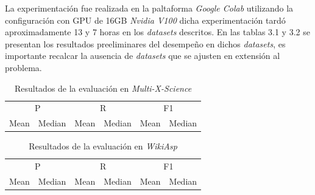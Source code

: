 La experimentación fue realizada en la paltaforma \emph{Google Colab} utilizando la configuración con GPU de 16GB \emph{Nvidia V100} dicha experimentación tardó aproximadamente 13 y 7 horas en los \emph{datasets} descritos. En las tablas 3.1 y 3.2 se presentan los resultados preeliminares del desempeño en dichos \emph{datasets}, es importante recalcar la ausencia de \emph{datasets} que se ajusten en extensión al problema.

\begin{table}[htb]
    \centering
    \label{tab:example}
    \begin{tabular}{*6c}
      \toprule
      \multicolumn{2}{c}{P}  & \multicolumn{2}{c}{R} & \multicolumn{2}{c}{F1} \\ \cmidrule(r){1-2} \cmidrule(r){3-4} \cmidrule(l){5-6}
      Mean & Median  &  Mean & Median &     Mean & Median   \\
                                                      
      \bottomrule
    \end{tabular}
    \caption{Resultados de la evaluación en \emph{Multi-X-Science}}

  \end{table}

  \begin{table}[htb]
    \centering
    \label{tab:example}
    \begin{tabular}{*6c}
      \toprule
      \multicolumn{2}{c}{P}  & \multicolumn{2}{c}{R} & \multicolumn{2}{c}{F1} \\ \cmidrule(r){1-2} \cmidrule(r){3-4} \cmidrule(l){5-6}
      Mean & Median  &  Mean & Median &     Mean & Median   \\
                                                      
      \bottomrule
    \end{tabular}
    \caption{Resultados de la evaluación en \emph{WikiAsp}}

    
  \end{table}